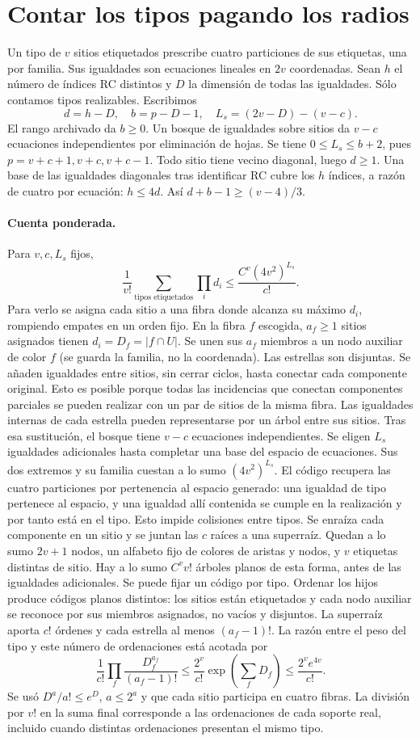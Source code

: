 \section{Contar los tipos pagando los radios}
Un tipo de $v$ sitios etiquetados prescribe cuatro particiones de sus etiquetas,
una por familia. Sus igualdades son ecuaciones lineales en $2v$ coordenadas.
Sean $h$ el número de índices RC distintos y $D$ la dimensión de todas las
igualdades. Sólo contamos tipos realizables. Escribimos
\[
 d=h-D,\quad b=p-D-1,\quad L_s=(2v-D)-(v-c).
\]
El rango archivado da $b\ge0$. Un bosque de igualdades sobre sitios da $v-c$
ecuaciones independientes por eliminación de hojas. Se tiene $0\le L_s\le b+2$,
pues $p=v+c+1,v+c,v+c-1$. Todo sitio tiene vecino diagonal, luego $d\ge1$.
Una base de las igualdades diagonales tras identificar RC cubre los $h$ índices,
a razón de cuatro por ecuación: $h\le4d$. Así $d+b-1\ge(v-4)/3$.
\paragraph{Cuenta ponderada.}
Para $v,c,L_s$ fijos,
\[
 \frac1{v!}\sum_{\text{tipos etiquetados}}\prod_i d_i
       \le \frac{C^v(4v^2)^{L_s}}{c!}.
\]
Para verlo se asigna cada sitio a una fibra donde alcanza su máximo $d_i$,
rompiendo empates en un orden fijo. En la fibra $f$ escogida, $a_f\ge1$ sitios
asignados tienen $d_i=D_f=|f\cap U|$. Se unen sus $a_f$ miembros a un nodo auxiliar
de color $f$ (se guarda la familia, no la coordenada). Las estrellas son disjuntas.
Se añaden igualdades entre sitios, sin cerrar ciclos, hasta conectar cada componente
original. Esto es posible porque todas las incidencias que conectan componentes
parciales se pueden realizar con un par de sitios de la misma fibra.
Las igualdades internas de cada estrella pueden representarse por un árbol entre
sus sitios. Tras esa sustitución, el bosque tiene $v-c$ ecuaciones independientes.
Se eligen $L_s$ igualdades adicionales hasta completar una base del espacio de
ecuaciones. Sus dos extremos y su familia cuestan a lo sumo $(4v^2)^{L_s}$.
El código recupera las cuatro particiones por pertenencia al espacio generado:
una igualdad de tipo pertenece al espacio, y una igualdad allí contenida se cumple
en la realización y por tanto está en el tipo. Esto impide colisiones entre tipos.
Se enraíza cada componente en un sitio y se juntan las $c$ raíces a una superraíz.
Quedan a lo sumo $2v+1$ nodos, un alfabeto fijo de colores de aristas y nodos,
y $v$ etiquetas distintas de sitio. Hay a lo sumo $C^v v!$ árboles planos de esta
forma, antes de las igualdades adicionales. Se puede fijar un código por tipo.
Ordenar los hijos produce códigos planos distintos: los sitios están etiquetados y
cada nodo auxiliar se reconoce por sus miembros asignados, no vacíos y disjuntos.
La superraíz aporta $c!$ órdenes y cada estrella al menos $(a_f-1)!$.
La razón entre el peso del tipo y este número de ordenaciones está acotada por
\[
 \frac1{c!}\prod_f\frac{D_f^{a_f}}{(a_f-1)!}
 \le \frac{2^v}{c!}\exp\left(\sum_fD_f\right)\le \frac{2^ve^{4v}}{c!}.
\]
Se usó $D^a/a!\le e^D$, $a\le2^a$ y que cada sitio participa en cuatro fibras.
La división por $v!$ en la suma final corresponde a las ordenaciones de cada soporte
real, incluido cuando distintas ordenaciones presentan el mismo tipo.
